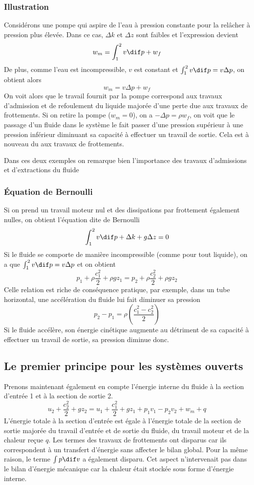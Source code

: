 \subsubsection{Illustration}
Considérons une pompe qui aspire de l'eau à pression constante
pour la relâcher à pression plus élevée.
Dans ce cas, $\Delta k$ et $\Delta z$ sont faibles et l'expression devient
\[ w_m = \int_1^2v\dif p +w_f \]
De plus, comme l'eau est incompressible,
$v$ est constant et $\int_1^2 v\dif p = v \Delta p$, on obtient alors
\[ w_m = v \Delta p + w_f \]
On voit alors que le travail fournit par la pompe correspond
aux travaux d'admission et de refoulement du
liquide majorée d'une perte due aux travaux de frottements.
Si on retire la pompe ($w_m = 0$), on a $-\Delta p = \rho w_f$,
on voit que le passage d'un fluide dans le système le fait passer
d'une pression supérieur à une pression inférieur diminuant
sa capacité à effectuer un travail de sortie.
Cela est à nouveau du aux travaux de frottements.

Dans ces deux exemples on remarque bien
l'importance des travaux d'admissions et d'extractions du fluide

\subsubsection{Équation de Bernoulli}
Si on prend un travail moteur nul et
des dissipations par frottement également nulles,
on obtient l'équation dite de Bernoulli
\[ \int_1^2 v\dif p + \Delta k + g \Delta z = 0 \]
Si le fluide se comporte de manière incompressible (comme pour tout liquide),
on a que $\int_1^2 v\dif p = v \Delta p$ et on obtient
\[ p_1 + \rho \frac{c_1^2}{2}+\rho gz_1 =
  p_2 + \rho \frac{c_2^2}{2}+\rho gz_2 \]
Celle relation est riche de conséquence pratique, par exemple,
dans un tube horizontal,
une accélération du fluide lui fait diminuer sa pression
\[  p_2 - p_1 = \rho \left (\frac{c_1^2-c_2^2}{2}\right) \]
Si le fluide accélère,
son énergie cinétique augmente au détriment de sa capacité à
effectuer un travail de sortie, sa pression diminue donc.

\subsection{Le premier principe pour les systèmes ouverts}
Prenons maintenant également en compte l'énergie interne
du fluide à la section d'entrée 1 et à la section de sortie 2.
\[ u_2 + \frac{c_2^2}{2} +gz_2 =
u_1 +\frac{c_1^2}{2} + gz_1 + p_1v_1- p_2v_2 + w_m + q \]
L'énergie totale à la section d'entrée est égale à
l'énergie totale de la section de sortie majorée du travail d'entrée et
de sortie du fluide, du travail moteur et de la chaleur reçue $q$.
Les termes des travaux de frottements ont disparus car
ils correspondent à un transfert d'énergie sans affecter le bilan global.
Pour la même raison, le terme $\int p \dif v$ a également disparu.
Cet aspect n'intervenait pas dans le bilan d'énergie mécanique
car la chaleur était stockée sous forme d'énergie interne.

